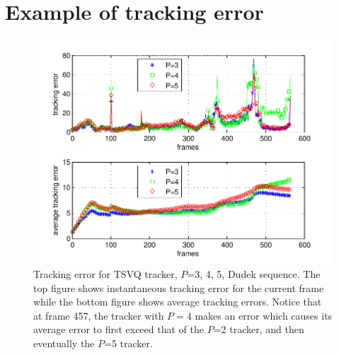 \clearpage
\newpage
\section{Example of tracking error}
\label{App:TSVQ_Dudek_example}
\begin{figure}[h!]
\centering
\includegraphics[width=1.0\textwidth]{temp/Dudek_TSVQ_errors.pdf}
\caption{Tracking error for TSVQ tracker, $P$=3, 4, 5, Dudek sequence.  The top figure shows instantaneous tracking error for the current frame while the bottom figure shows average tracking errors.  Notice that at frame 457, the tracker with $P=4$ makes an error which causes its average error to first exceed that of the $P$=2 tracker, and then eventually the $P$=5 tracker.}
\label{fig:results_TSVQ_Dudek_errors}
\end{figure}

